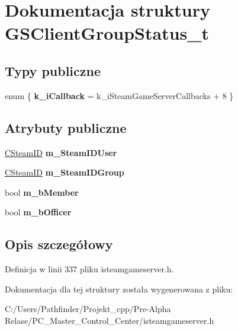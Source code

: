 \hypertarget{struct_g_s_client_group_status__t}{}\section{Dokumentacja struktury G\+S\+Client\+Group\+Status\+\_\+t}
\label{struct_g_s_client_group_status__t}
\subsection*{Typy publiczne}
\begin{DoxyCompactItemize}
\item 
\mbox{\label{struct_g_s_client_group_status__t_af95a929a4384f999696cca1f5f281647}} 
enum \{ {\bfseries k\+\_\+i\+Callback} = k\+\_\+i\+Steam\+Game\+Server\+Callbacks + 8
 \}
\end{DoxyCompactItemize}
\subsection*{Atrybuty publiczne}
\begin{DoxyCompactItemize}
\item 
\mbox{\label{struct_g_s_client_group_status__t_a8330bc23381be1a79337aa9982ae3280}} 
\hyperlink{class_c_steam_i_d}{C\+Steam\+ID} {\bfseries m\+\_\+\+Steam\+I\+D\+User}
\item 
\mbox{\label{struct_g_s_client_group_status__t_a85f988b80b043141107879af5daf4cc7}} 
\hyperlink{class_c_steam_i_d}{C\+Steam\+ID} {\bfseries m\+\_\+\+Steam\+I\+D\+Group}
\item 
\mbox{\label{struct_g_s_client_group_status__t_a0ef7c9a3c893359ae991b79dc58bd7da}} 
bool {\bfseries m\+\_\+b\+Member}
\item 
\mbox{\label{struct_g_s_client_group_status__t_a5e173d80981816b8f820813d0751e3d3}} 
bool {\bfseries m\+\_\+b\+Officer}
\end{DoxyCompactItemize}


\subsection{Opis szczegółowy}


Definicja w linii 337 pliku isteamgameserver.\+h.



Dokumentacja dla tej struktury została wygenerowana z pliku\+:\begin{DoxyCompactItemize}
\item 
C\+:/\+Users/\+Pathfinder/\+Projekt\+\_\+cpp/\+Pre-\/\+Alpha Relase/\+P\+C\+\_\+\+Master\+\_\+\+Control\+\_\+\+Center/isteamgameserver.\+h\end{DoxyCompactItemize}
